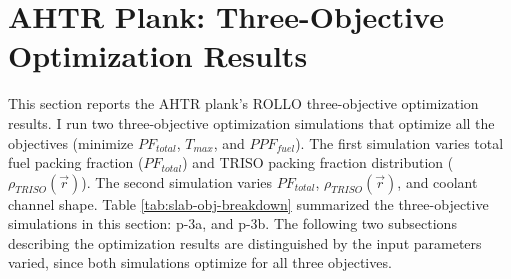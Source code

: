 \section{AHTR Plank: Three-Objective Optimization Results}
\label{sec:plank-three-obj}
This section reports the \gls{AHTR} plank's \gls{ROLLO} three-objective 
optimization results. 
I run two three-objective optimization simulations that optimize all the 
objectives (minimize $PF_{total}$, $T_{max}$, and $PPF_{fuel}$). 
The first simulation varies total fuel packing fraction ($PF_{total}$) and \gls{TRISO} 
packing fraction distribution ($\rho_{TRISO}(\vec{r})$).
The second simulation varies $PF_{total}$, $\rho_{TRISO}(\vec{r})$, and coolant channel 
shape. 
Table \ref{tab:slab-obj-breakdown} summarized the three-objective simulations in this 
section: p-3a, and p-3b. 
The following two subsections describing the optimization results are distinguished 
by the input parameters varied, since both simulations optimize for all three 
objectives. 

